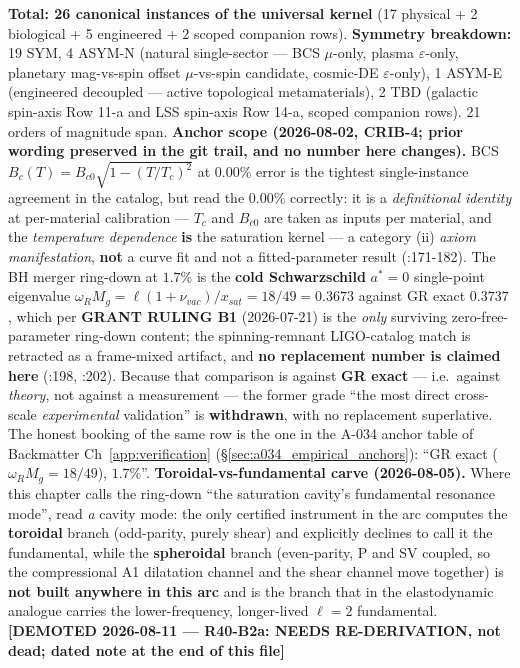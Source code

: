 \textbf{Total: 26 canonical instances of the universal kernel} (17 physical
+ 2 biological + 5 engineered + 2 scoped companion rows). \textbf{Symmetry
breakdown:} 19 SYM, 4 ASYM-N (natural single-sector --- BCS $\mu$-only,
plasma $\varepsilon$-only, planetary mag-vs-spin offset $\mu$-vs-spin
candidate, cosmic-DE $\varepsilon$-only), 1 ASYM-E (engineered decoupled ---
active topological metamaterials), 2 TBD (galactic spin-axis Row 11-a and
LSS spin-axis Row 14-a, scoped companion rows).
21 orders of magnitude span. \textbf{Anchor scope (2026-08-02, CRIB-4; prior wording preserved in the git trail, and no number here changes).} BCS $B_c(T) = B_{c0}\sqrt{1-(T/T_c)^2}$ at 0.00\% error is the tightest single-instance agreement in the catalog, but read the $0.00\%$ correctly: it is a \emph{definitional identity} at per-material calibration --- $T_c$ and $B_{c0}$ are taken as inputs per material, and the \emph{temperature dependence} \textbf{is} the saturation kernel --- a category (ii) \emph{axiom manifestation}, \textbf{not} a curve fit and not a fitted-parameter result (:171-182).
The BH merger ring-down at $1.7\%$ is the \textbf{cold Schwarzschild} $a^{*} = 0$ single-point eigenvalue $\omega_R M_g = \ell(1+\nu_{vac})/x_{sat} = 18/49 = 0.3673$ against GR exact $0.3737$, which per \textbf{GRANT RULING B1} (2026-07-21) is the \emph{only} surviving zero-free-parameter ring-down content; the spinning-remnant LIGO-catalog match is retracted as a frame-mixed artifact, and \textbf{no replacement number is claimed here} (:198, :202).
Because that comparison is against \textbf{GR exact} --- i.e.\ against \emph{theory}, not against a measurement --- the former grade ``the most direct cross-scale \emph{experimental} validation'' is \textbf{withdrawn}, with no replacement superlative. The honest booking of the same row is the one in the A-034 anchor table of Backmatter Ch~\ref{app:verification} (\S\ref{sec:a034_empirical_anchors}): ``GR exact ($\omega_R M_g = 18/49$), $1.7\%$''. \textbf{Toroidal-vs-fundamental carve (2026-08-05).} Where this chapter calls the ring-down ``the saturation cavity's fundamental resonance mode'', read \emph{a} cavity mode: the only certified instrument in the arc computes the \textbf{toroidal} branch (odd-parity, purely shear) and explicitly declines to call it the fundamental, while the \textbf{spheroidal} branch (even-parity, P and SV coupled, so the compressional A1 dilatation channel and the shear channel move together) is \textbf{not built anywhere in this arc} and is the branch that in the elastodynamic analogue carries the lower-frequency, longer-lived $\ell = 2$ fundamental. \textbf{[DEMOTED 2026-08-11 --- R40-B2a: NEEDS RE-DERIVATION, not dead; dated note at the end of this file]}
